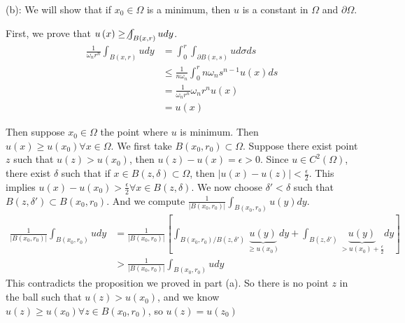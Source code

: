 \documentclass[a4paper]{article}
\theoremstyle{definition}
\begin{document}
	(b): We will show that if $x_0\in \Omega$ is a minimum, then $u$ is a constant in $\Omega$ and $\partial \Omega$. 
	
	First, we prove that $u\left( x \right) \ge \not \int_{B\left( x,r \right) }udy$. 
	\begin{align*}
		\frac{1}{\omega_n r^{n}}\int_{ B\left( x,r \right) }udy&= \int_{0}^{r} \int_{\partial B\left( x,s \right) }^{}ud\sigma ds    \\
		&\le \frac{1}{n\omega_n }\int^{r}_{0} n\omega_n s^{n-1}u\left( x \right) ds  \\
		&=\frac{1}{\omega_n r^{n}} \omega_n r^{n}u\left( x \right)  \\
		&= u\left( x \right)  
	\end{align*} 

	Then suppose $x_0 \in \Omega$ the point where $u$ is minimum. Then $u\left( x \right) \ge u\left( x_0 \right) \forall x\in \Omega$. We first take $B\left( x_0,r_0 \right) \subset \Omega$. Suppose there exist point $z$ such that $u\left( z \right) > u\left( x_0 \right) $, then $u\left( z \right) -u\left( x \right) =\epsilon>0$. Since $u \in C^{2}\left( \Omega \right) $, there exist $\delta$ such that if $x\in B\left( z,\delta \right)\subset \Omega $, then $|u\left( x \right) -u\left( z \right)| <\frac{\epsilon}{2}$. This implies $u\left( x \right) -u\left( x_0 \right) >\frac{\epsilon}{2}\forall x\in B\left( z,\delta \right) $. We now choose $\delta'<\delta$ such that $B\left( z,\delta' \right) \subset B\left( x_0,r_0 \right) $. And we compute $\frac{1}{\left| B\left( x_0,r_0 \right)  \right| }\int_{B\left( x_0,r_0 \right) }u\left( y \right) dy$. 
	\begin{align*}
                \frac{1}{\left| B\left( x_0,r_0 \right)  \right| }\int_{B\left( x_0,r_0 \right) }udy&= \frac{1}{\left| B\left( x_0,r_0 \right)  \right| }\left[ \int_{B\left( x_0,r_0 \right) / B\left( z,\delta' \right) }^{}\underbrace{ u\left( y \right)}_{\ge u\left( x_0 \right) }dy+\int_{B\left( z,\delta' \right) }\underbrace{u\left( y \right) }_{>u\left( x_0\right)+\frac{\epsilon}{2}}  dy   \right]  \\
                        &> \frac{1}{\left| B\left( x_0,r_0 \right)  \right| }\int_{B\left( x_0,r_0 \right) }udy
    \end{align*}
    This contradicts the proposition we proved in part (a). So there is no point $z$ in the ball such that $u\left( z \right) >u\left( x_0 \right) $, and we know $u\left( z \right) \ge u\left( x_0 \right)\forall z\in B\left( x_0,r_0 \right)  $, so $u\left( z \right) =u\left( z_0 \right) $
\end{document}
